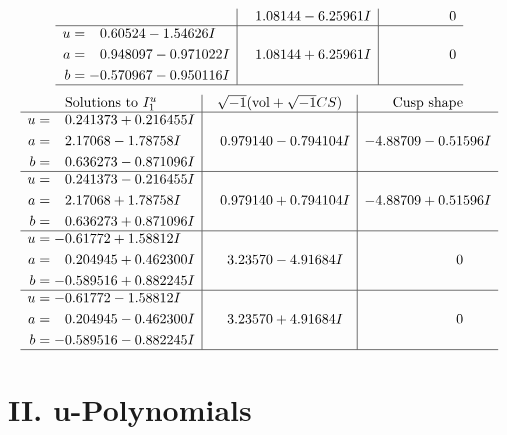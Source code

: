 \documentclass[1p]{elsarticle_modified}
\theoremstyle{definition}
\newcommand{\I}{\sqrt{-1}}
\begin{document}
$$\begin{array}{c|c|c}
 & \phantom{-}1.08144 - 6.25961 I & \phantom{-0.000000 } 0 \\ \hline\begin{aligned}
u &= \phantom{-}0.60524 - 1.54626 I \\
a &= \phantom{-}0.948097 - 0.971022 I \\
b &= -0.570967 - 0.950116 I\end{aligned}
 & \phantom{-}1.08144 + 6.25961 I & \phantom{-0.000000 } 0\\
 \hline 
 \end{array}$$\newpage$$\begin{array}{c|c|c}  
\text{Solutions to }I^u_{1}& \I (\text{vol} + \sqrt{-1}CS) & \text{Cusp shape}\\
 \hline 
\begin{aligned}
u &= \phantom{-}0.241373 + 0.216455 I \\
a &= \phantom{-}2.17068 - 1.78758 I \\
b &= \phantom{-}0.636273 - 0.871096 I\end{aligned}
 & \phantom{-}0.979140 - 0.794104 I & -4.88709 - 0.51596 I \\ \hline\begin{aligned}
u &= \phantom{-}0.241373 - 0.216455 I \\
a &= \phantom{-}2.17068 + 1.78758 I \\
b &= \phantom{-}0.636273 + 0.871096 I\end{aligned}
 & \phantom{-}0.979140 + 0.794104 I & -4.88709 + 0.51596 I \\ \hline\begin{aligned}
u &= -0.61772 + 1.58812 I \\
a &= \phantom{-}0.204945 + 0.462300 I \\
b &= -0.589516 + 0.882245 I\end{aligned}
 & \phantom{-}3.23570 - 4.91684 I & \phantom{-0.000000 } 0 \\ \hline\begin{aligned}
u &= -0.61772 - 1.58812 I \\
a &= \phantom{-}0.204945 - 0.462300 I \\
b &= -0.589516 - 0.882245 I\end{aligned}
 & \phantom{-}3.23570 + 4.91684 I & \phantom{-0.000000 } 0\\
 \hline 
 \end{array}$$\newpage
\newpage\renewcommand{\arraystretch}{1}
\centering \section*{ II. u-Polynomials}
\end{document}
